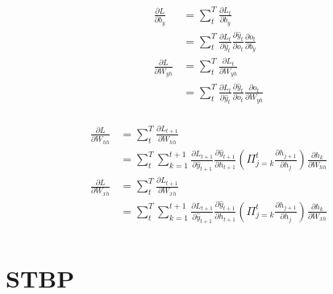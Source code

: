\documentclass{beamer}
\begin{document}
\begin{frame}
    \begin{equation*}
        \begin{aligned}
            \frac{\partial L}{\partial b_y}
            &= \sum_t^T\frac{\partial L_t}{\partial b_y} \\
            &= \sum_t^T\frac{\partial L_t}{\partial\hat{y}_t}\frac{\partial\hat{y}_t}{\partial o_t}\frac{\partial o_t}{\partial b_y} \\
            \frac{\partial L}{\partial W_{yh}}
            &= \sum_t^T\frac{\partial L_t}{\partial W_{yh}} \\
            &= \sum_t^T\frac{\partial L_t}{\partial\hat{y}_t}\frac{\partial\hat{y}_t}{\partial o_t}\frac{\partial o_t}{\partial W_{yh}} \\
        \end{aligned}
    \end{equation*}
\end{frame}

\begin{frame}
    \begin{equation*}
        \begin{aligned}
            \frac{\partial L}{\partial W_{hh}}
            &= \sum_t^T\frac{\partial L_{t+1}}{\partial W_{hh}} \\
            &= \sum_t^T\sum_{k=1}^{t+1}\frac{\partial L_{t+1}}{\partial\hat{y}_{t+1}}\frac{\partial\hat{y}_{t+1}}{\partial h_{t+1}}\left(\Pi_{j=k}^t\frac{\partial h_{j+1}}{\partial h_j}\right)\frac{\partial h_k}{\partial W_{hh}} \\
            \frac{\partial L}{\partial W_{xh}}
            &= \sum_t^T\frac{\partial L_{t+1}}{\partial W_{xh}} \\
            &= \sum_t^T\sum_{k=1}^{t+1}\frac{\partial L_{t+1}}{\partial\hat{y}_{t+1}}\frac{\partial\hat{y}_{t+1}}{\partial h_{t+1}}\left(\Pi_{j=k}^t\frac{\partial h_{j+1}}{\partial h_j}\right)\frac{\partial h_k}{\partial W_{xh}} \\
        \end{aligned}
    \end{equation*}
\end{frame}

\section{STBP}
\end{document}
